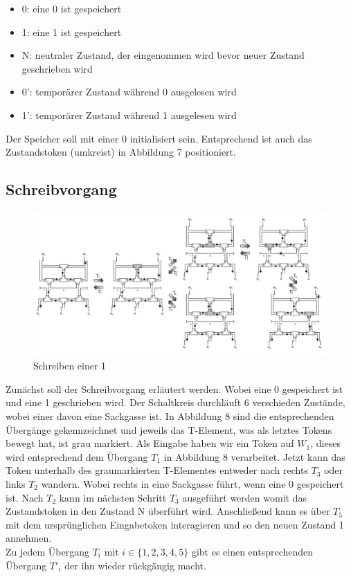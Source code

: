 \documentclass[11pt,a4paper]{article}
\begin{document}
\begin{itemize}
    \item 0: eine 0 ist gespeichert
    \item 1: eine 1 ist gespeichert 
    \item N: neutraler Zustand, der eingenommen wird bevor
        neuer Zustand geschrieben wird
    \item 0': temporärer Zustand während 0 ausgelesen wird
    \item 1': temporärer Zustand während 1 ausgelesen wird
\end{itemize}

Der Speicher soll mit einer 0 initialisiert sein.
%
Entsprechend ist auch das Zustandstoken (umkreist) in Abbildung 7 positioniert.


\subsection{Schreibvorgang}

\begin{figure}[h]
      \includegraphics[width=14cm]{bilder/write1Mem.png} 
      \caption{Schreiben einer 1}
\end{figure}

Zunächst soll der Schreibvorgang erläutert werden.
%
Wobei eine 0 gespeichert ist und eine 1 geschrieben wird.
%
Der Schaltkreis durchläuft 6 verschieden Zustände, wobei einer 
davon eine Sackgasse ist.
%
In Abbildung 8 sind die entsprechenden Übergänge gekennzeichnet 
und jeweils das T-Element, was als letztes Tokens bewegt hat, ist grau markiert.
%
Als Eingabe haben wir ein Token auf $ W_{1} $, dieses wird entsprechend 
dem Übergang $ T_{1} $ in Abbildung 8 verarbeitet.
%
Jetzt kann das Token unterhalb des graumarkierten T-Elementes entweder
nach rechts $ T_{3} $ oder links $ T_{2} $ wandern. 
%
Wobei rechts in eine Sackgasse führt, wenn eine 0 gespeichert ist.
%
Nach $ T_{2} $ kann im nächsten Schritt $ T_{3} $ ausgeführt werden
womit das Zustandstoken in den Zustand N überführt wird.
%
Anschließend kann es über $ T_{5} $ mit dem ursprünglichen Eingabetoken
interagieren und so den neuen Zustand 1 annehmen. \\
%
Zu jedem Übergang $ T_{i} $ mit $ i \in \{1, 2, 3, 4, 5\} $ gibt es einen 
entsprechenden Übergang $ T'_{i} $ der ihn wieder rückgängig macht.
\end{document}

